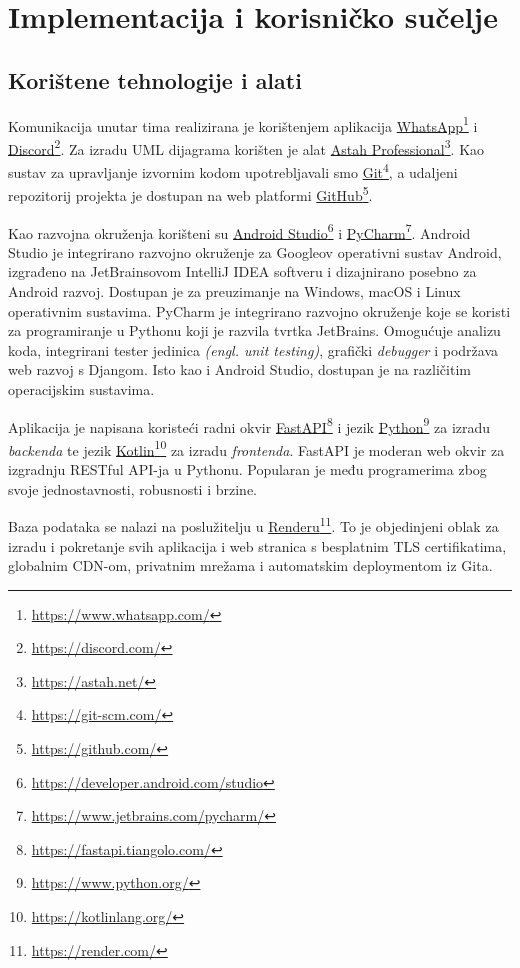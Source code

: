 \chapter{Implementacija i korisničko sučelje}
		
		
		\section{Korištene tehnologije i alati}
		
			Komunikacija unutar tima realizirana je korištenjem aplikacija \underline{WhatsApp}\footnote{\url{https://www.whatsapp.com/}} i \underline{Discord}\footnote{\url{https://discord.com/}}. Za izradu UML dijagrama korišten je alat \underline{Astah Professional}\footnote{\url{https://astah.net/}}. Kao sustav za upravljanje izvornim kodom upotrebljavali smo \underline{Git}\footnote{\url{https://git-scm.com/}}, a udaljeni repozitorij projekta je dostupan na web platformi \underline{GitHub}\footnote{\url{https://github.com/}}.

			Kao razvojna okruženja korišteni su \underline{Android Studio}\footnote{\url{https://developer.android.com/studio}} i \underline{PyCharm}\footnote{\url{https://www.jetbrains.com/pycharm/}}. Android Studio je integrirano razvojno okruženje za Googleov operativni sustav Android, izgrađeno na JetBrainsovom IntelliJ IDEA softveru i dizajnirano posebno za Android razvoj. Dostupan je za preuzimanje na Windows, macOS i Linux operativnim sustavima. PyCharm  je integrirano razvojno okruženje koje se koristi za programiranje u Pythonu koji je razvila tvrtka JetBrains. Omogućuje analizu koda, integrirani tester jedinica \textit{(engl. unit testing)}, grafički \textit{debugger} i podržava web razvoj s Djangom. Isto kao i Android Studio, dostupan je na različitim operacijskim sustavima.

			Aplikacija je napisana koristeći radni okvir \underline{FastAPI}\footnote{\url{https://fastapi.tiangolo.com/}} i jezik \underline{Python}\footnote{\url{https://www.python.org/}} za izradu \textit{backenda} te jezik \underline{Kotlin}\footnote{\url{https://kotlinlang.org/}} za izradu \textit{frontenda}. FastAPI je moderan web okvir za izgradnju RESTful API-ja u Pythonu. Popularan je među programerima zbog svoje jednostavnosti, robusnosti i brzine.

			Baza podataka se nalazi na poslužitelju u \underline{Renderu}\footnote{\url{https://render.com/}}. To je objedinjeni oblak za izradu i pokretanje svih aplikacija i web stranica s besplatnim TLS certifikatima, globalnim CDN-om, privatnim mrežama i automatskim deploymentom iz Gita.
			
